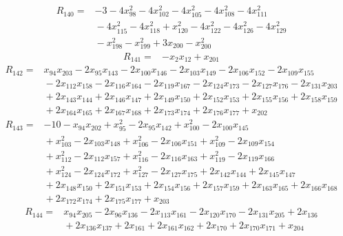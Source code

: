 {\begin{align*}
R_{140} ={}& -3 - 4x_{98}^{2} - 4x_{102}^{2} - 4x_{105}^{2} - 4x_{108}^{2} - 4x_{111}^{2} \\
&{}  - 4x_{115}^{2} - 4x_{118}^{2} + x_{120}^{2} - 4x_{122}^{2} - 4x_{126}^{2} - 4x_{129}^{2} \\
&{}  - x_{198}^{2} - x_{199}^{2} + 3x_{200} - x_{200}^{2}
\end{align*}
\begin{align*}
R_{141} ={}& -x_{2} x_{12} + x_{201}
\end{align*}
\begin{align*}
R_{142} ={}& x_{94} x_{203} - 2x_{95} x_{143} - 2x_{100} x_{146} - 2x_{103} x_{149} - 2x_{106} x_{152} - 2x_{109} x_{155} \\
&{}  - 2x_{112} x_{158} - 2x_{116} x_{164} - 2x_{119} x_{167} - 2x_{124} x_{173} - 2x_{127} x_{176} - 2x_{131} x_{203} \\
&{}  + 2x_{143} x_{144} + 2x_{146} x_{147} + 2x_{149} x_{150} + 2x_{152} x_{153} + 2x_{155} x_{156} + 2x_{158} x_{159} \\
&{}  + 2x_{164} x_{165} + 2x_{167} x_{168} + 2x_{173} x_{174} + 2x_{176} x_{177} + x_{202}
\end{align*}
\begin{align*}
R_{143} ={}& -10 - x_{94} x_{202} + x_{95}^{2} - 2x_{95} x_{142} + x_{100}^{2} - 2x_{100} x_{145} \\
&{}  + x_{103}^{2} - 2x_{103} x_{148} + x_{106}^{2} - 2x_{106} x_{151} + x_{109}^{2} - 2x_{109} x_{154} \\
&{}  + x_{112}^{2} - 2x_{112} x_{157} + x_{116}^{2} - 2x_{116} x_{163} + x_{119}^{2} - 2x_{119} x_{166} \\
&{}  + x_{124}^{2} - 2x_{124} x_{172} + x_{127}^{2} - 2x_{127} x_{175} + 2x_{142} x_{144} + 2x_{145} x_{147} \\
&{}  + 2x_{148} x_{150} + 2x_{151} x_{153} + 2x_{154} x_{156} + 2x_{157} x_{159} + 2x_{163} x_{165} + 2x_{166} x_{168} \\
&{}  + 2x_{172} x_{174} + 2x_{175} x_{177} + x_{203}
\end{align*}
\begin{align*}
R_{144} ={}& x_{94} x_{205} - 2x_{96} x_{136} - 2x_{113} x_{161} - 2x_{120} x_{170} - 2x_{131} x_{205} + 2x_{136} \\
&{}  + 2x_{136} x_{137} + 2x_{161} + 2x_{161} x_{162} + 2x_{170} + 2x_{170} x_{171} + x_{204} \\

\end{align*}}
